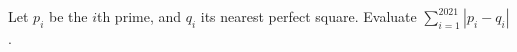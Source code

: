 Let $p_i$ be the $i$th prime, and $q_i$ its nearest perfect square. Evaluate $\sum_{i=1}^{2021}|p_i-q_i|$.
